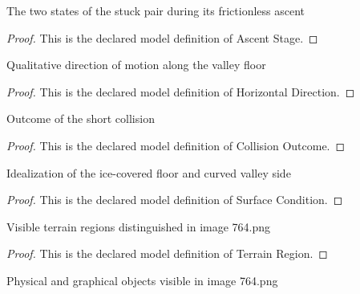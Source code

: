 \begin{definition}
  \label{def:physics:phyx-mini-0764:phyxminiproblems-problemphyxmini0764-ascentstage}
  The two states of the stuck pair during its frictionless ascent
\end{definition}
\begin{proof}
  This is the declared model definition of Ascent Stage.
\end{proof}
\begin{definition}
  \label{def:physics:phyx-mini-0764:phyxminiproblems-problemphyxmini0764-horizontaldirection}
  Qualitative direction of motion along the valley floor
\end{definition}
\begin{proof}
  This is the declared model definition of Horizontal Direction.
\end{proof}
\begin{definition}
  \label{def:physics:phyx-mini-0764:phyxminiproblems-problemphyxmini0764-collisionoutcome}
  Outcome of the short collision
\end{definition}
\begin{proof}
  This is the declared model definition of Collision Outcome.
\end{proof}
\begin{definition}
  \label{def:physics:phyx-mini-0764:phyxminiproblems-problemphyxmini0764-surfacecondition}
  Idealization of the ice-covered floor and curved valley side
\end{definition}
\begin{proof}
  This is the declared model definition of Surface Condition.
\end{proof}
\begin{definition}
  \label{def:physics:phyx-mini-0764:phyxminiproblems-problemphyxmini0764-terrainregion}
  Visible terrain regions distinguished in image 764.png
\end{definition}
\begin{proof}
  This is the declared model definition of Terrain Region.
\end{proof}
\begin{definition}
  \label{def:physics:phyx-mini-0764:phyxminiproblems-problemphyxmini0764-figureobject}
  Physical and graphical objects visible in image 764.png
\end{definition}

